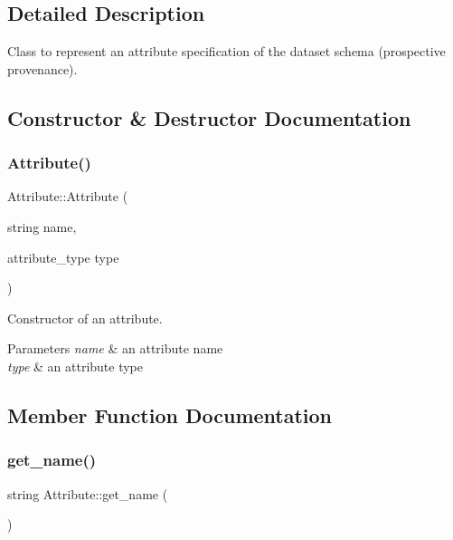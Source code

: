 \subsection{Detailed Description}
Class to represent an attribute specification of the dataset schema (prospective provenance). 

\subsection{Constructor \& Destructor Documentation}
\mbox{\label{classAttribute_af984b2d6d550fbfd05ebae632f1c2aac}} 
\subsubsection{\texorpdfstring{Attribute()}{Attribute()}}
{\footnotesize\ttfamily Attribute\+::\+Attribute (\begin{DoxyParamCaption}\item[{string}]{name,  }\item[{attribute\+\_\+type}]{type }\end{DoxyParamCaption})\hspace{0.3cm}{\ttfamily [inline]}}

Constructor of an attribute. 
\begin{DoxyParams}{Parameters}
{\em name} & an attribute name \\
\hline
{\em type} & an attribute type \\
\hline
\end{DoxyParams}


\subsection{Member Function Documentation}
\mbox{\label{classAttribute_a4a2e75358b3e66e08ad0b798ceb19e8f}} 
\subsubsection{\texorpdfstring{get\+\_\+name()}{get\_name()}}
{\footnotesize\ttfamily string Attribute\+::get\+\_\+name (\begin{DoxyParamCaption}{ }\end{DoxyParamCaption})}

